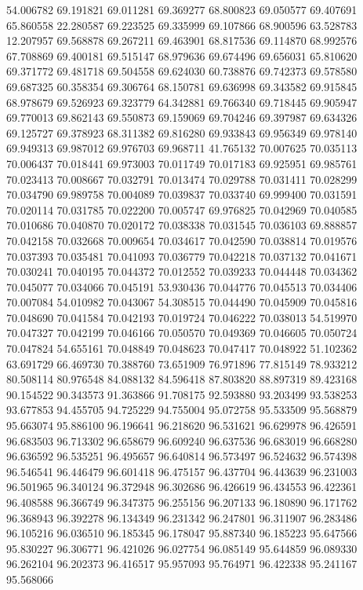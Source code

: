 54.006782
69.191821
69.011281
69.369277
68.800823
69.050577
69.407691
65.860558
22.280587
69.223525
69.335999
69.107866
68.900596
63.528783
12.207957
69.568878
69.267211
69.463901
68.817536
69.114870
68.992576
67.708869
69.400181
69.515147
68.979636
69.674496
69.656031
65.810620
69.371772
69.481718
69.504558
69.624030
60.738876
69.742373
69.578580
69.687325
60.358354
69.306764
68.150781
69.636998
69.343582
69.915845
68.978679
69.526923
69.323779
64.342881
69.766340
69.718445
69.905947
69.770013
69.862143
69.550873
69.159069
69.704246
69.397987
69.634326
69.125727
69.378923
68.311382
69.816280
69.933843
69.956349
69.978140
69.949313
69.987012
69.976703
69.968711
41.765132
70.007625
70.035113
70.006437
70.018441
69.973003
70.011749
70.017183
69.925951
69.985761
70.023413
70.008667
70.032791
70.013474
70.029788
70.031411
70.028299
70.034790
69.989758
70.004089
70.039837
70.033740
69.999400
70.031591
70.020114
70.031785
70.022200
70.005747
69.976825
70.042969
70.040585
70.010686
70.040870
70.020172
70.038338
70.031545
70.036103
69.888857
70.042158
70.032668
70.009654
70.034617
70.042590
70.038814
70.019576
70.037393
70.035481
70.041093
70.036779
70.042218
70.037132
70.041671
70.030241
70.040195
70.044372
70.012552
70.039233
70.044448
70.034362
70.045077
70.034066
70.045191
53.930436
70.044776
70.045513
70.034406
70.007084
54.010982
70.043067
54.308515
70.044490
70.045909
70.045816
70.048690
70.041584
70.042193
70.019724
70.046222
70.038013
54.519970
70.047327
70.042199
70.046166
70.050570
70.049369
70.046605
70.050724
70.047824
54.655161
70.048849
70.048623
70.047417
70.048922
51.102362
63.691729
66.469730
70.388760
73.651909
76.971896
77.815149
78.933212
80.508114
80.976548
84.088132
84.596418
87.803820
88.897319
89.423168
90.154522
90.343573
91.363866
91.708175
92.593880
93.203499
93.538253
93.677853
94.455705
94.725229
94.755004
95.072758
95.533509
95.568879
95.663074
95.886100
96.196641
96.218620
96.531621
96.629978
96.426591
96.683503
96.713302
96.658679
96.609240
96.637536
96.683019
96.668280
96.636592
96.535251
96.495657
96.640814
96.573497
96.524632
96.574398
96.546541
96.446479
96.601418
96.475157
96.437704
96.443639
96.231003
96.501965
96.340124
96.372948
96.302686
96.426619
96.434553
96.422361
96.408588
96.366749
96.347375
96.255156
96.207133
96.180890
96.171762
96.368943
96.392278
96.134349
96.231342
96.247801
96.311907
96.283486
96.105216
96.036510
96.185345
96.178047
95.887340
96.185223
95.647566
95.830227
96.306771
96.421026
96.027754
96.085149
95.644859
96.089330
96.262104
96.202373
96.416517
95.957093
95.764971
96.422338
95.241167
95.568066
